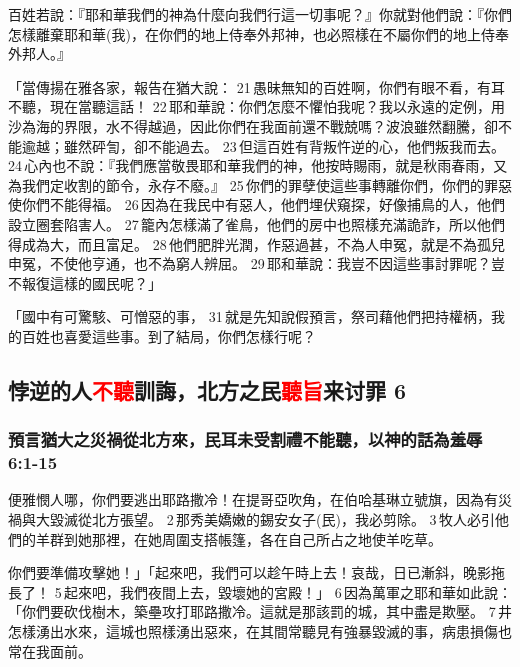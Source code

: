 百姓若說：『耶和華我們的神為什麼向我們行這一切事呢？』你就對他們說：『你們怎樣離棄耶和華(我)，在你們的地上侍奉外邦神，也必照樣在不屬你們的地上侍奉外邦人。』

「當傳揚在雅各家，報告在猶大說： 21 愚昧無知的百姓啊，你們有眼不看，有耳不聽，現在當聽這話！ 22 耶和華說：你們怎麼不懼怕我呢？我以永遠的定例，用沙為海的界限，水不得越過，因此你們在我面前還不戰兢嗎？波浪雖然翻騰，卻不能逾越；雖然砰訇，卻不能過去。 23 但這百姓有背叛忤逆的心，他們叛我而去。 24 心內也不說：『我們應當敬畏耶和華我們的神，他按時賜雨，就是秋雨春雨，又為我們定收割的節令，永存不廢。』 25 你們的罪孽使這些事轉離你們，你們的罪惡使你們不能得福。 26 因為在我民中有惡人，他們埋伏窺探，好像捕鳥的人，他們設立圈套陷害人。 27 籠內怎樣滿了雀鳥，他們的房中也照樣充滿詭詐，所以他們得成為大，而且富足。 28 他們肥胖光潤，作惡過甚，不為人申冤，就是不為孤兒申冤，不使他亨通，也不為窮人辨屈。 29 耶和華說：我豈不因這些事討罪呢？豈不報復這樣的國民呢？」

「國中有可驚駭、可憎惡的事， 31 就是先知說假預言，祭司藉他們把持權柄，我的百姓也喜愛這些事。到了結局，你們怎樣行呢？

\subsection{悖逆的人\textcolor{red}{不聽}訓誨，北方之民\textcolor{red}{聽旨}来讨罪 6}
\subsubsection{預言猶大之災禍從北方來，民耳未受割禮不能聽，以神的話為羞辱 6:1-15}
便雅憫人哪，你們要逃出耶路撒冷！在提哥亞吹角，在伯哈基琳立號旗，因為有災禍與大毀滅從北方張望。 2 那秀美嬌嫩的錫安女子(民)，我必剪除。 3 牧人必引他們的羊群到她那裡，在她周圍支搭帳篷，各在自己所占之地使羊吃草。

你們要準備攻擊她！」「起來吧，我們可以趁午時上去！哀哉，日已漸斜，晚影拖長了！ 5 起來吧，我們夜間上去，毀壞她的宮殿！」 6 因為萬軍之耶和華如此說：「你們要砍伐樹木，築壘攻打耶路撒冷。這就是那該罰的城，其中盡是欺壓。 7 井怎樣湧出水來，這城也照樣湧出惡來，在其間常聽見有強暴毀滅的事，病患損傷也常在我面前。

